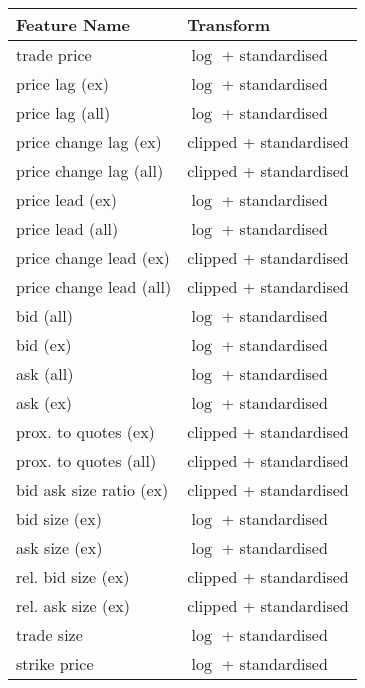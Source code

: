 \begin{table}[H]
    \centering
    \begin{threeparttable}
        \begin{tabular}{@{}ll@{}}
            \toprule
            Feature Name            & Transform              \\ \midrule
            trade price             & $\log$ + standardised  \\
            price lag (ex)          & $\log$ + standardised  \\
            price lag (all)         & $\log$ + standardised  \\
            price change lag (ex)   & clipped + standardised \\
            price change lag (all)  & clipped + standardised \\
            price lead (ex)         & $\log$ + standardised  \\
            price lead (all)        & $\log$ + standardised  \\
            price change lead (ex)  & clipped + standardised \\
            price change lead (all) & clipped + standardised \\
            bid (all)               & $\log$ + standardised  \\
            bid (ex)                & $\log$ + standardised  \\
            ask (all)               & $\log$ + standardised  \\
            ask (ex)                & $\log$ + standardised  \\
            prox. to quotes (ex)    & clipped + standardised \\
            prox. to quotes (all)   & clipped + standardised \\
            bid ask size ratio (ex) & clipped + standardised \\
            bid size (ex)           & $\log$ + standardised  \\
            ask size (ex)           & $\log$ + standardised  \\
            rel. bid size (ex)      & clipped + standardised \\
            rel. ask size (ex)      & clipped + standardised \\
            trade size              & $\log$ + standardised  \\
            strike price            & $\log$ + standardised  \\

\end{tabular}
\end{threeparttable}
\end{table}
